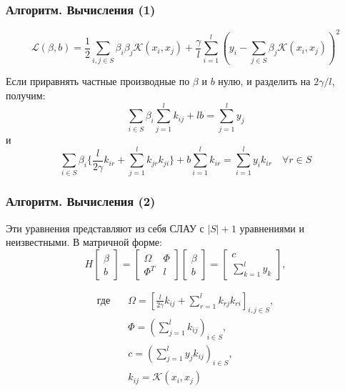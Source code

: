 \documentclass{beamer}
\begin{document}
\begin{frame}
	\frametitle{Алгоритм. Вычисления (1)}
	\begin{equation*}
		\mathcal{L}(\beta, b) = \frac{1}{2} \sum_{i,j \in S} \beta_i \beta_j
		\mathcal{K}(x_i, x_j)
		+ \frac{\gamma}{l} \sum_{i=1}^{l} (y_i - \sum_{j \in S} \beta_j
		\mathcal{K}(x_i, x_j))^2
	\end{equation*}

	Если приравнять частные производные по $\beta$ и $b$ нулю, и разделить на
	$2\gamma / l$, получим:
	\begin{equation*}
		\sum_{i \in S}\beta_i \sum_{j = 1}^{l}k_{ij} + lb = \sum_{j=1}^{l}y_j
	\end{equation*}
	и
	\[
		\sum_{i \in S} \beta_i \{ \frac{l}{2\gamma} k_{ir} + \sum_{j = 1}^{l}k_{jr}
		k_{ji}\} + b \sum_{i=1}^{l}k_{ir} = \sum_{i=1}^{l}y_i k_{ir} \quad
		\forall r \in S
	\]

\end{frame}

\begin{frame}
	\frametitle{Алгоритм. Вычисления (2)}

	Эти уравнения представляют из себя СЛАУ с $|S| + 1$ уравнениями и
	неизвестными. В матричной форме:
	\begin{equation*}
		H \begin{bmatrix}
			\beta \\
			b
		\end{bmatrix} =
		\begin{bmatrix}
			\Omega & \Phi \\
			\Phi^T & l
		\end{bmatrix}
		\begin{bmatrix}
			\beta \\
			b
		\end{bmatrix}
		= \begin{bmatrix}
			c \\
			\sum_{k = 1}^{l} y_k
		\end{bmatrix},
	\end{equation*}

	\vspace{-20pt}
	\begin{flushleft}
		\begin{align*}
			\text{где} \quad & \Omega = [ \frac{l}{2\gamma}k_{ij} + \sum_{r = 1}^{l} k_{rj} k_{ri}
			]_{i,j \in S},                                                                         \\
			                 & \Phi = (\sum_{j=1}^{l}k_{ij})_{i \in S},                            \\
			                 & c = ( \sum_{j=1}^{l}y_j k_{ij} )_{i \in S},                         \\
			                 & k_{ij} = \mathcal{K}(x_i, x_j)
		\end{align*}
	\end{flushleft}



\end{frame}
\end{document}
